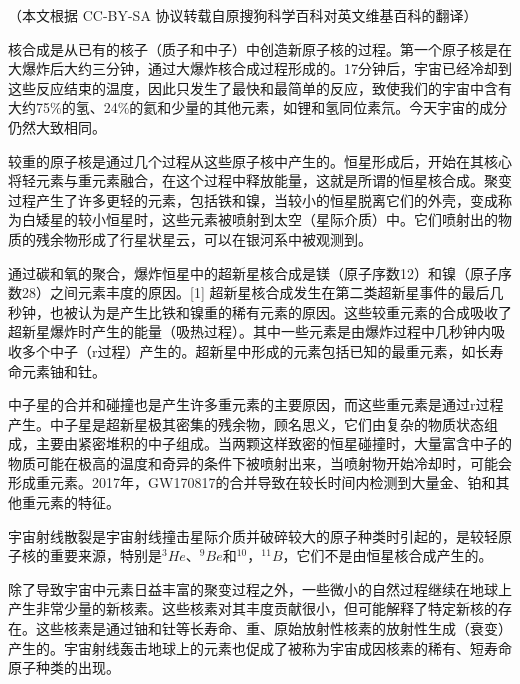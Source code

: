 
（本文根据 CC-BY-SA 协议转载自原搜狗科学百科对英文维基百科的翻译）

核合成是从已有的核子（质子和中子）中创造新原子核的过程。第一个原子核是在大爆炸后大约三分钟，通过大爆炸核合成过程形成的。17分钟后，宇宙已经冷却到这些反应结束的温度，因此只发生了最快和最简单的反应，致使我们的宇宙中含有大约75\%的氢、24\%的氦和少量的其他元素，如锂和氢同位素氘。今天宇宙的成分仍然大致相同。

较重的原子核是通过几个过程从这些原子核中产生的。恒星形成后，开始在其核心将轻元素与重元素融合，在这个过程中释放能量，这就是所谓的恒星核合成。聚变过程产生了许多更轻的元素，包括铁和镍，当较小的恒星脱离它们的外壳，变成称为白矮星的较小恒星时，这些元素被喷射到太空（星际介质）中。它们喷射出的物质的残余物形成了行星状星云，可以在银河系中被观测到。

通过碳和氧的聚合，爆炸恒星中的超新星核合成是镁（原子序数12）和镍（原子序数28）之间元素丰度的原因。[1] 超新星核合成发生在第二类超新星事件的最后几秒钟，也被认为是产生比铁和镍重的稀有元素的原因。这些较重元素的合成吸收了超新星爆炸时产生的能量（吸热过程）。其中一些元素是由爆炸过程中几秒钟内吸收多个中子（r过程）产生的。超新星中形成的元素包括已知的最重元素，如长寿命元素铀和钍。

中子星的合并和碰撞也是产生许多重元素的主要原因，而这些重元素是通过r过程产生。中子星是超新星极其密集的残余物，顾名思义，它们由复杂的物质状态组成，主要由紧密堆积的中子组成。当两颗这样致密的恒星碰撞时，大量富含中子的物质可能在极高的温度和奇异的条件下被喷射出来，当喷射物开始冷却时，可能会形成重元素。2017年，GW170817的合并导致在较长时间内检测到大量金、铂和其他重元素的特征。

宇宙射线散裂是宇宙射线撞击星际介质并破碎较大的原子种类时引起的，是较轻原子核的重要来源，特别是$^{3}He$、$^{9}Be$和$^{10}$，$^{11}B$，它们不是由恒星核合成产生的。

除了导致宇宙中元素日益丰富的聚变过程之外，一些微小的自然过程继续在地球上产生非常少量的新核素。这些核素对其丰度贡献很小，但可能解释了特定新核的存在。这些核素是通过铀和钍等长寿命、重、原始放射性核素的放射性生成（衰变）产生的。宇宙射线轰击地球上的元素也促成了被称为宇宙成因核素的稀有、短寿命原子种类的出现。

